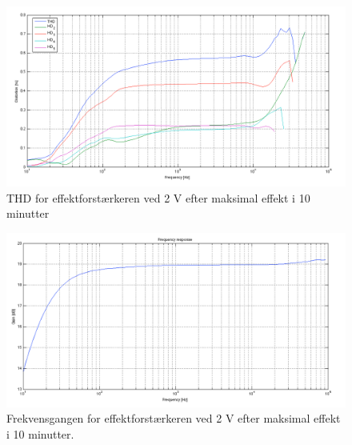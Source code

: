 \begin{figure}[h]
\centering
\includegraphics[width=\textwidth]{maalerapporter/effektforstaerker/thd_effekt_fuldudstyring_10min.png}
\caption{THD for effektforstærkeren ved 2 V  efter maksimal effekt i 10 minutter}
\label{fig:apeff:thd2v}
\end{figure}

\begin{figure}[h]
\centering
\includegraphics[width=\textwidth]{maalerapporter/effektforstaerker/gain_effekt_fuldudstyring_10min.png}
\caption{ Frekvensgangen for effektforstærkeren ved 2 V efter maksimal effekt i 10 minutter.}
\label{fig:apeff:thd2v}
\end{figure}

